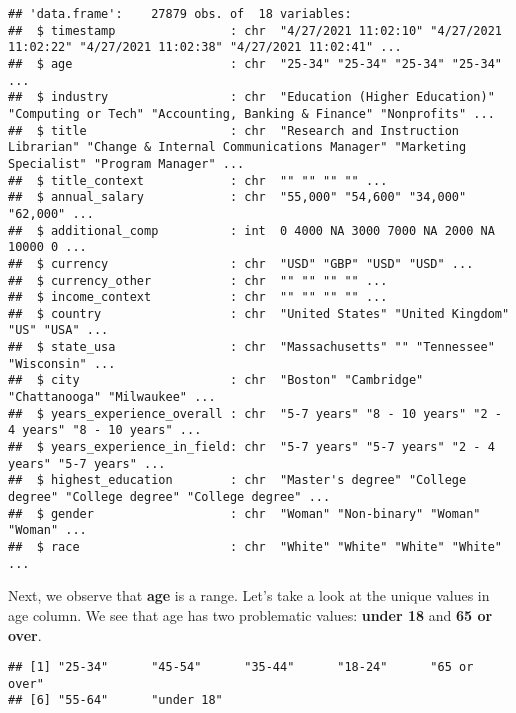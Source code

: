 \documentclass[
]{article}
\newenvironment{Shaded}{\begin{snugshade}}{\end{snugshade}}
\newcommand{\FunctionTok}[1]{\textcolor[rgb]{0.00,0.00,0.00}{#1}}
\newcommand{\NormalTok}[1]{#1}
\newcommand{\SpecialCharTok}[1]{\textcolor[rgb]{0.00,0.00,0.00}{#1}}
\begin{document}
\begin{verbatim}
## 'data.frame':    27879 obs. of  18 variables:
##  $ timestamp                : chr  "4/27/2021 11:02:10" "4/27/2021 11:02:22" "4/27/2021 11:02:38" "4/27/2021 11:02:41" ...
##  $ age                      : chr  "25-34" "25-34" "25-34" "25-34" ...
##  $ industry                 : chr  "Education (Higher Education)" "Computing or Tech" "Accounting, Banking & Finance" "Nonprofits" ...
##  $ title                    : chr  "Research and Instruction Librarian" "Change & Internal Communications Manager" "Marketing Specialist" "Program Manager" ...
##  $ title_context            : chr  "" "" "" "" ...
##  $ annual_salary            : chr  "55,000" "54,600" "34,000" "62,000" ...
##  $ additional_comp          : int  0 4000 NA 3000 7000 NA 2000 NA 10000 0 ...
##  $ currency                 : chr  "USD" "GBP" "USD" "USD" ...
##  $ currency_other           : chr  "" "" "" "" ...
##  $ income_context           : chr  "" "" "" "" ...
##  $ country                  : chr  "United States" "United Kingdom" "US" "USA" ...
##  $ state_usa                : chr  "Massachusetts" "" "Tennessee" "Wisconsin" ...
##  $ city                     : chr  "Boston" "Cambridge" "Chattanooga" "Milwaukee" ...
##  $ years_experience_overall : chr  "5-7 years" "8 - 10 years" "2 - 4 years" "8 - 10 years" ...
##  $ years_experience_in_field: chr  "5-7 years" "5-7 years" "2 - 4 years" "5-7 years" ...
##  $ highest_education        : chr  "Master's degree" "College degree" "College degree" "College degree" ...
##  $ gender                   : chr  "Woman" "Non-binary" "Woman" "Woman" ...
##  $ race                     : chr  "White" "White" "White" "White" ...
\end{verbatim}

Next, we observe that \textbf{age} is a range. Let's take a look at the
unique values in age column. We see that age has two problematic values:
\textbf{under 18} and \textbf{65 or over}.

\begin{Shaded}
\end{Shaded}

\begin{verbatim}
## [1] "25-34"      "45-54"      "35-44"      "18-24"      "65 or over"
## [6] "55-64"      "under 18"
\end{verbatim}
\end{document}
